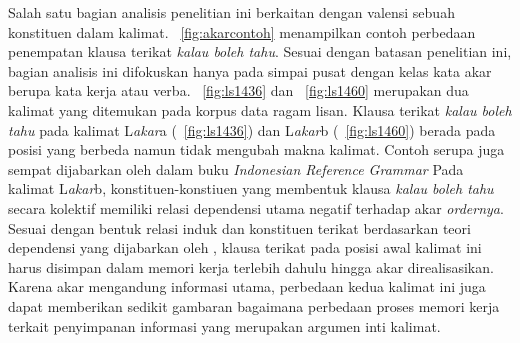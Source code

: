 Salah satu bagian analisis penelitian ini berkaitan dengan valensi sebuah konstituen dalam kalimat. \pic~\ref{fig:akarcontoh} menampilkan contoh perbedaan penempatan klausa terikat \textit{kalau boleh tahu}. Sesuai dengan batasan penelitian ini, bagian analisis ini difokuskan hanya pada simpai pusat dengan kelas kata akar berupa kata kerja atau verba. \pic~\ref{fig:ls1436} dan \pic~\ref{fig:ls1460} merupakan dua kalimat yang ditemukan pada korpus data ragam lisan. Klausa terikat \textit{kalau boleh tahu} pada kalimat L\textit{akar}a (\pic~\ref{fig:ls1436}) dan L\textit{akar}b (\pic~\ref{fig:ls1460}) berada pada posisi yang berbeda namun tidak mengubah makna kalimat. Contoh serupa juga sempat dijabarkan oleh \cite{sneddon2010indonesian} dalam buku \textit{Indonesian Reference Grammar} Pada kalimat L\textit{akar}b, konstituen-konstiuen yang membentuk klausa \textit{kalau boleh tahu} secara kolektif memiliki relasi dependensi utama negatif terhadap akar \textit{ordernya}. Sesuai dengan bentuk relasi induk dan konstituen terikat berdasarkan teori dependensi yang dijabarkan oleh \cite{tesniere1959elements}, klausa terikat pada posisi awal kalimat ini harus disimpan dalam memori kerja terlebih dahulu hingga akar direalisasikan. Karena akar mengandung informasi utama, perbedaan kedua kalimat ini juga dapat memberikan sedikit gambaran bagaimana perbedaan proses memori kerja terkait penyimpanan informasi yang merupakan argumen inti kalimat.


